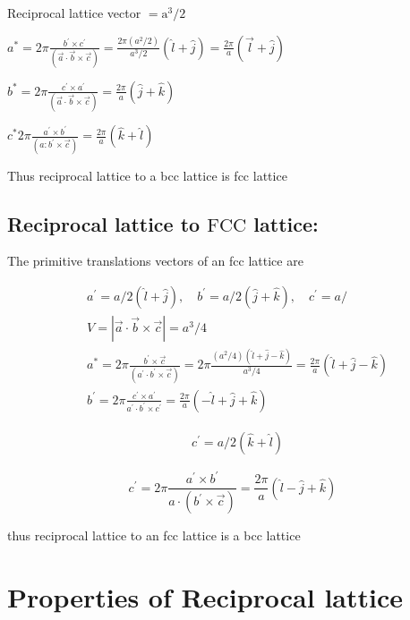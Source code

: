 Reciprocal lattice vector $=\mathrm{a}^{3} / 2$

$a^{*}=2 \pi \frac{b^{\prime} \times c^{\prime}}{(\vec{a} \cdot \vec{b} \times \vec{c})}=\frac{2 \pi\left(a^{2} / 2\right)}{a^{3} / 2}(\hat{l}+\hat{j})=\frac{2 \pi}{a}(\vec{l}+\hat{j})$

$b^{*}=2 \pi \frac{c^{\prime} \times a^{\prime}}{(\vec{a} \cdot \vec{b} \times \vec{c})}=\frac{2 \pi}{a}(\hat{j}+\hat{k})$

$c^{*} 2 \pi \frac{a^{\prime} \times b^{\prime}}{\left(a: b^{\prime} \times \vec{c}\right)}=\frac{2 \pi}{a}(\hat{k}+\hat{l})$

Thus reciprocal lattice to a bcc lattice is fcc lattice

\subsection{Reciprocal lattice to $\mathrm{FCC}$ lattice:}

The primitive translations vectors of an fcc lattice are

$$
\begin{aligned}
&a^{\prime}=a / 2(\hat{l}+\hat{j}), \quad b^{\prime}=a / 2(\hat{j}+\hat{k}), \quad c^{\prime}=a / \\
&V=|\vec{a} \cdot \vec{b} \times \vec{c}|=a^{3} / 4 \\
&a^{*}=2 \pi \frac{b^{\prime} \times \vec{c}}{\left(a^{\prime} \cdot b^{\prime} \times \vec{c}\right)}=2 \pi \frac{\left(a^{2} / 4\right)(\hat{l}+\hat{j}-\hat{k})}{a^{3} / 4}=\frac{2 \pi}{a}(\hat{l}+\hat{j}-\hat{k}) \\
&b^{\prime}=2 \pi \frac{c^{\prime} \times a^{\prime}}{a^{\prime} \cdot b^{\prime} \times c^{\prime}}=\frac{2 \pi}{a}(-\hat{l}+\hat{j}+\hat{k})
\end{aligned}
$$

$$
\begin{aligned}
& c^{\prime}=a / 2(\hat{k}+\hat{l}) 
\end{aligned}
$$


$$
c^{\prime}=2 \pi \frac{a^{\prime} \times b^{\prime}}{a \cdot\left(b^{\prime} \times \vec{c}\right)}=\frac{2 \pi}{a}(\hat{l}-\hat{j}+\hat{k})
$$

thus reciprocal lattice to an fcc lattice is a bcc lattice

\section{Properties of Reciprocal lattice}

